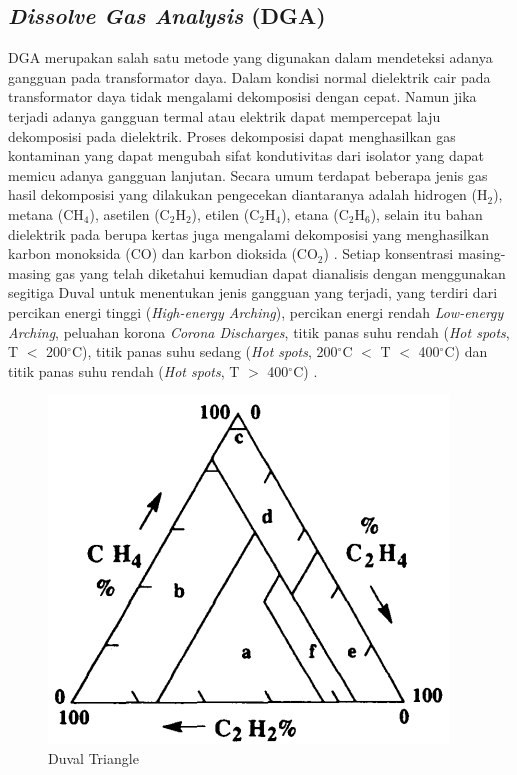 \subsection{\textit{Dissolve Gas Analysis} (DGA)}
DGA merupakan salah satu metode yang digunakan dalam mendeteksi adanya gangguan pada transformator daya. Dalam kondisi normal dielektrik cair pada transformator daya tidak mengalami dekomposisi dengan cepat. Namun jika terjadi adanya gangguan termal atau elektrik dapat mempercepat laju dekomposisi pada dielektrik. Proses dekomposisi dapat menghasilkan gas kontaminan yang dapat mengubah sifat kondutivitas dari isolator yang dapat memicu adanya gangguan lanjutan. Secara umum terdapat beberapa jenis gas hasil dekomposisi yang dilakukan pengecekan diantaranya adalah hidrogen (H$_2$), metana (CH$_4$), asetilen (C$_2$H$_2$), etilen (C$_2$H$_4$), etana (C$_2$H$_6$), selain itu bahan dielektrik pada berupa kertas juga mengalami dekomposisi yang menghasilkan karbon monoksida (CO) dan karbon dioksida (CO$_2$) \cite{ahmed2013power}. Setiap konsentrasi masing-masing gas yang telah diketahui kemudian dapat dianalisis dengan menggunakan segitiga Duval untuk menentukan jenis gangguan yang terjadi, yang terdiri dari percikan energi tinggi (\textit{High-energy Arching}), percikan energi rendah \textit{Low-energy Arching}, peluahan korona \textit{Corona Discharges}, titik panas suhu rendah (\textit{Hot spots}, T $<$ 200$^{\circ}$C), titik panas suhu sedang (\textit{Hot spots}, 200$^{\circ}$C $<$ T $<$ 400$^{\circ}$C) dan titik panas suhu rendah (\textit{Hot spots}, T $>$ 400$^{\circ}$C) \cite{duval1989dissolved}.
\begin{center}
\begin{figure}[h]
    \includegraphics[width=\textwidth]{BAB-2/figures/duval triangle.png}	
	    \caption{Duval Triangle \cite{duval1989dissolved}}
	    \label{gambar:duval triangle}
\end{figure}
\end{center}



